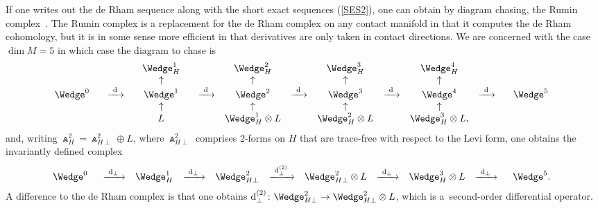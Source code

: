 \documentclass[pdftex]{sigma}%
\numberwithin{equation}{section}
\begin{document}
If one writes out the de Rham sequence along with the short exact
sequences (\ref{SES2}), one can obtain by diagram chasing, the Rumin
complex~\cite{R}. The Rumin complex is a replacement for the de Rham complex
on any contact manifold in that it computes the de Rham cohomology, but it is
in some sense more efficient in that derivatives are only taken in contact
directions. We are concerned with the case $\dim M = 5$ in which case the
diagram to chase is
\[\begin{array}{@{}ccccccccccc}
&&\Wedge_H^1&&\Wedge_H^2&&\Wedge_H^3&&\Wedge_H^4&&\\
&&\uparrow&&\uparrow&&\uparrow&&\uparrow&&\\
\Wedge^0 & \hspace{3mm}\xrightarrow{\ {\rm d}\ }
\hspace{3mm} & \Wedge^1&\hspace{3mm}\xrightarrow{\ {\rm d}\ }&\Wedge^2
&\xrightarrow{\ {\rm d}\ }&\Wedge^3
&\xrightarrow{\ {\rm d}\ }&\Wedge^4
& \xrightarrow{\ {\rm d}\ }& \hspace{3mm}\Wedge^5\\\
&&\uparrow&&\uparrow&&\uparrow&&\uparrow&&\\
&&L&&\Wedge_H^1\otimes L && \Wedge_H^2\otimes L && \Wedge_H^3\otimes L,&&
\end{array}\]
and, writing $\Wedge_H^2=\Wedge_{H\perp}^2\oplus L$, where $\Wedge_{H\perp}^2$
comprises $2$-forms on $H$ that are trace-free with respect to the Levi form,
one obtains the invariantly defined complex
\[\begin{array}{@{}ccccccccccc}
\Wedge^0 & \hspace{2mm} \xrightarrow{\ {\rm d}_\perp \ }
& \Wedge^1_H&\xrightarrow{\ {\rm d}_\perp \ }
&\Wedge^2_{H\perp}&\xrightarrow{\ {\rm d}_\perp^{(2)} \ }
&\Wedge_{H\perp}^2 \otimes L&\xrightarrow{\ {\rm d}_\perp \ }
&\Wedge^3_H \otimes L & \xrightarrow{\ {\rm d}_\perp \ }
& \hspace{2mm} \Wedge^5.
\end{array}\]
A difference to the de Rham complex is that one obtains
${\rm d}_\perp^{(2)}\colon \Wedge_{H\perp}^2 \to \Wedge_{H\perp}^2 \otimes L$,
which is a~second-order differential operator.
\end{document}
